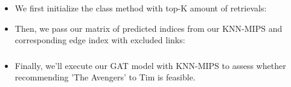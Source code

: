 \documentclass{beamer}
\begin{document}

\begin{frame}[fragile]
\begin{itemize}
\frametitle{Recall @ K: Code}

\item We first initialize the class method with top-K amount of retrievals:



\vspace{0.5cm}

\item Then, we pass our matrix of predicted indices from our KNN-MIPS and corresponding edge index with excluded links:



\end{itemize}
\end{frame}


\begin{frame}
\frametitle{}

\begin{minipage}[c]{0.8\textwidth}
    \hspace{1cm}
    
\end{minipage}
\end{frame}


\begin{frame}[fragile]
\begin{itemize}
\frametitle{Case Study: Simplified Movie Recommendation System}

\item Finally, we'll execute our GAT model with KNN-MIPS to assess whether recommending 'The Avengers' to Tim is feasible.

\vspace{0.5cm}

\begin{minipage}[c]{0.8\textwidth}
    \hspace{1cm}
    
\end{minipage}

\end{itemize}
\end{frame}
\end{document}
